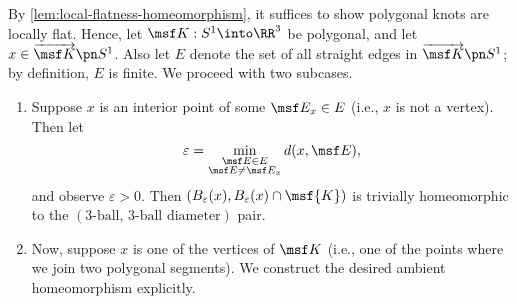 \begin{sproof}
  By \cref{lem:local-flatness-homeomorphism}, it suffices to show
  polygonal knots are locally flat. Hence, let $\msf K : S^1 \into
  \RR^3$ be polygonal, and let $x \in \fim{\msf K}{S^1}$. Also let $E$
  denote the set of all straight edges in $\fim{\msf K}{S^1}$; by
  definition, $E$ is finite. We proceed with two subcases.
  \begin{enumerate}[label=\arabic*)]
    \item Suppose $x$ is an interior point of some $\msf E_x \in E$
      (i.e., $x$ is not a vertex). Then let
      \[
      \varepsilon = \min_{\substack{\msf E \in E \\ \msf E \neq \msf
      E_x}} d(x, \msf E),
      \]
      and observe $\varepsilon > 0$. Then $(B_\varepsilon(x),
      B_\varepsilon(x) \cap \msf{K})$ is trivially homeomorphic to the
      $(\text{3-ball, 3-ball diameter})$ pair.
    \item Now, suppose $x$ is one of the vertices of $\msf K$ (i.e.,
      one of the points where we join two polygonal segments). We
      construct the desired ambient homeomorphism explicitly.


\end{enumerate}
\end{sproof}
